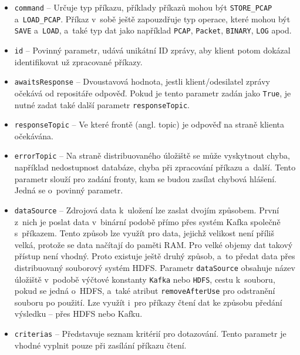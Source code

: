 \begin{itemize}
    \item \texttt{command} -- Určuje typ příkazu, příklady příkazů mohou být \texttt{STORE\_PCAP} a~\texttt{LOAD\_PCAP}. Příkaz v~sobě ještě zapouzdřuje typ operace, které mohou být \texttt{SAVE} a~\texttt{LOAD}, a~také typ dat jako například \texttt{PCAP}, \texttt{Packet}, \texttt{BINARY}, \texttt{LOG} apod.
    
    \item \texttt{id} -- Povinný parametr, udává unikátní ID zprávy, aby klient potom dokázal identifikovat už zpracované příkazy.
    
    \item \texttt{awaitsResponse} -- Dvoustavová hodnota, jestli klient/odesilatel zprávy očekává od repositáře odpověď. Pokud je tento parametr zadán jako \texttt{True}, je nutné zadat také další parametr \texttt{responseTopic}.
    
    \item \texttt{responseTopic} -- Ve které frontě (angl. topic) je odpověď na straně klienta očekávána.
    
    \item \texttt{errorTopic} -- Na straně distribuovaného úložiště se může vyskytnout chyba, například nedostupnost databáze, chyba při zpracování příkazu a~další. Tento parametr slouží pro zadání fronty, kam se budou zasílat chybová hlášení. Jedná se o~povinný parametr.
    
    \item \texttt{dataSource} -- Zdrojová data k~uložení lze zaslat dvojím způsobem. První z~nich je poslat data v~binární podobě přímo přes systém Kafka společně s~příkazem. Tento způsob lze využít pro data, jejichž velikost není příliš velká, protože se data načítají do paměti RAM. Pro velké objemy dat takový přístup není vhodný. Proto existuje ještě druhý způsob, a~to předat data přes distribuovaný souborový systém HDFS. Parametr \texttt{dataSource} obsahuje název úložiště v~podobě výčtové konstanty \texttt{Kafka} nebo \texttt{HDFS}, cestu k~souboru, pokud se jedná o~HDFS, a~také atribut \texttt{removeAfterUse} pro odstranění souboru po použití. Lze využít i~pro příkazy čtení dat ke způsobu předání výsledku -- přes HDFS nebo Kafku.
    
    \item \texttt{criterias} -- Představuje seznam kritérií pro dotazování. Tento parametr je vhodné vyplnit pouze při zasílání příkazu čtení.
\end{itemize}

